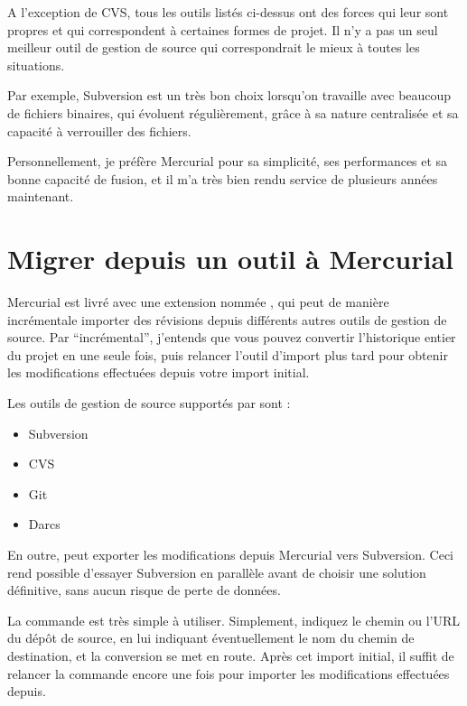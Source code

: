A l'exception de CVS, tous les outils listés ci-dessus ont des 
forces qui leur sont propres et qui correspondent à certaines
formes de projet. Il n'y a pas un seul meilleur outil de gestion
de source qui correspondrait le mieux à toutes les situations.

Par exemple, Subversion est un très bon choix lorsqu'on travaille
avec beaucoup de fichiers binaires, qui évoluent régulièrement, grâce
à sa nature centralisée et sa capacité à verrouiller des fichiers.

Personnellement, je préfère Mercurial pour sa simplicité, ses 
performances et sa bonne capacité de fusion, et il m'a très bien rendu service
de plusieurs années maintenant.

\section{Migrer depuis un outil à Mercurial}

Mercurial est livré avec une extension nommée , qui
peut de manière incrémentale importer des révisions depuis différents
autres outils de gestion de source. Par ``incrémental'', j'entends que
vous pouvez convertir l'historique entier du projet en une seule fois,
puis relancer l'outil d'import plus tard pour obtenir les modifications
effectuées depuis votre import initial.

Les outils de gestion de source supportés par  sont :
\begin{itemize}
	\item Subversion
	\item CVS
	\item Git
	\item Darcs
\end{itemize}

En outre,  peut exporter les modifications depuis Mercurial
vers Subversion. Ceci rend possible d'essayer Subversion en parallèle 
avant de choisir une solution définitive, sans aucun risque de perte de
données.

La commande  est très simple à utiliser. Simplement,
indiquez le chemin ou l'URL du dépôt de source, en lui indiquant éventuellement
le nom du chemin de destination, et la conversion se met en route. Après cet
import initial, il suffit de relancer la commande encore une fois pour 
importer les modifications effectuées depuis.

